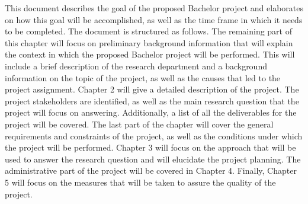 This document describes the goal of the proposed Bachelor project and elaborates on how this goal will be accomplished, as well as the time frame in which it needs to be completed. The document is structured as follows. The remaining part of this chapter will focus on preliminary background information that will explain the context in which the proposed Bachelor project will be performed. This will include a brief description of the research department and a background information on the topic of the project, as well as the causes that led to the project assignment. Chapter 2 will give a detailed description of the project. The project stakeholders are identified, as well as the main research question that the project will focus on answering. Additionally, a list of all the deliverables for the project will be covered. The last part of the chapter will cover the general requirements and constraints of the project, as well as the conditions under which the project will be performed. Chapter 3 will focus on the approach that will be used to answer the research question and will elucidate the project planning. The administrative part of the project will be covered in Chapter 4. Finally, Chapter 5 will focus on the measures that will be taken to assure the quality of the project.

